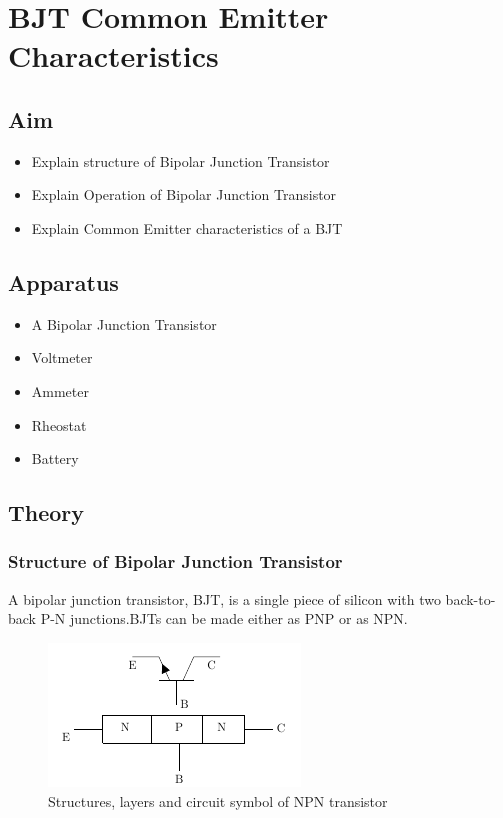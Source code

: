 \chapter{BJT Common Emitter Characteristics}
	\section{Aim}
		\begin{itemize}
			\tightlist
			\item Explain structure of Bipolar Junction Transistor
			\item Explain Operation of Bipolar Junction Transistor
			\item Explain Common Emitter characteristics of a BJT
		\end{itemize}
	
	\section{Apparatus}
		\begin{itemize}
			\tightlist
			\item A Bipolar Junction Transistor
			\item Voltmeter
			\item Ammeter
			\item Rheostat
			\item Battery
		\end{itemize}
	
	\section{Theory}
		\subsection{Structure of Bipolar Junction Transistor}
			A bipolar junction transistor, BJT, is a single piece of silicon with two back-to-back P-N junctions.BJTs can be made either as PNP or as NPN.
			\begin{figure}[h]
				\centering
				\includegraphics[width=0.5\linewidth]{img/exp9/1}
				\caption{Structures, layers and circuit symbol of NPN transistor}
				\label{fig:bjt_npn}
			\end{figure}
			
